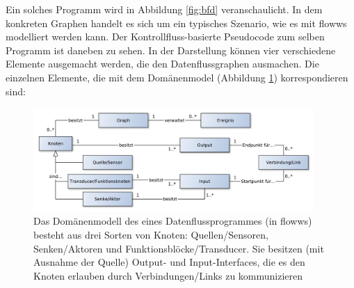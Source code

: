 Ein solches Programm wird in Abbildung \ref{fig:bfd} veranschaulicht. In dem konkreten Graphen handelt es sich um ein typisches Szenario, wie es mit flowws modelliert werden kann. Der Kontrollfluss-basierte Pseudocode zum selben Programm ist daneben zu sehen. In der Darstellung können vier verschiedene Elemente ausgemacht werden, die den Datenflussgraphen ausmachen. Die einzelnen Elemente, die mit dem Domänenmodel (Abbildung \ref{fig:bfddomainmodel}) korrespondieren sind:
\begin{figure}[h]
  \centering
  \includegraphics[width=0.95\textwidth]{bilder/chapter4/chapter4_2/domainmodelldatenfluss2.pdf}
  \caption{Das Domänenmodell des eines Datenflussprogrammes (in flowws) besteht aus drei Sorten von Knoten: Quellen/Sensoren, Senken/Aktoren und Funktionsblöcke/Transducer. Sie besitzen (mit Ausnahme der Quelle) Output- und Input-Interfaces, die es den Knoten erlauben durch Verbindungen/Links zu kommunizieren}
  \label{fig:bfddomainmodel}
\end{figure}

